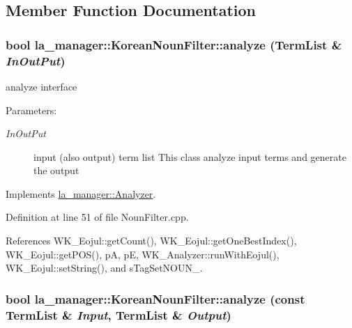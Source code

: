 \subsection{Member Function Documentation}
\hypertarget{classla__manager_1_1KoreanNounFilter_0ec4dcffc74feee2b7f72a2656c9c589}{
\subsubsection[{analyze}]{\setlength{\rightskip}{0pt plus 5cm}bool la\_\-manager::KoreanNounFilter::analyze ({\bf TermList} \& {\em InOutPut})}}
\label{classla__manager_1_1KoreanNounFilter_0ec4dcffc74feee2b7f72a2656c9c589}


analyze interface 

\begin{Desc}
\item[Parameters:]
\begin{description}
\item[{\em InOutPut}]input (also output) term list This class analyze input terms and generate the output \end{description}
\end{Desc}


Implements \hyperlink{classla__manager_1_1Analyzer_23414b773ec2070957e9aa3d6a7d8b78}{la\_\-manager::Analyzer}.

Definition at line 51 of file NounFilter.cpp.

References WK\_\-Eojul::getCount(), WK\_\-Eojul::getOneBestIndex(), WK\_\-Eojul::getPOS(), pA, pE, WK\_\-Analyzer::runWithEojul(), WK\_\-Eojul::setString(), and sTagSetNOUN\_\-.\hypertarget{classla__manager_1_1KoreanNounFilter_5722385ced3635d7d5f16cbc1db0f874}{
\subsubsection[{analyze}]{\setlength{\rightskip}{0pt plus 5cm}bool la\_\-manager::KoreanNounFilter::analyze (const {\bf TermList} \& {\em Input}, \/  {\bf TermList} \& {\em Output})}}
\label{classla__manager_1_1KoreanNounFilter_5722385ced3635d7d5f16cbc1db0f874}


